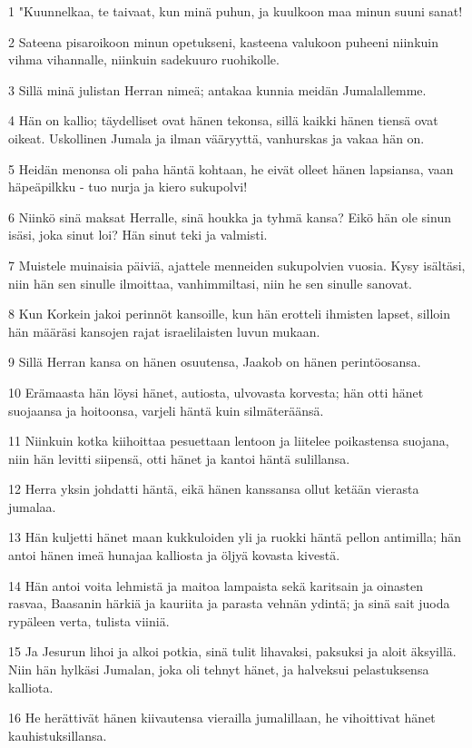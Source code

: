 \par 1 "Kuunnelkaa, te taivaat, kun minä puhun, ja kuulkoon maa minun suuni sanat!
\par 2 Sateena pisaroikoon minun opetukseni, kasteena valukoon puheeni niinkuin vihma vihannalle, niinkuin sadekuuro ruohikolle.
\par 3 Sillä minä julistan Herran nimeä; antakaa kunnia meidän Jumalallemme.
\par 4 Hän on kallio; täydelliset ovat hänen tekonsa, sillä kaikki hänen tiensä ovat oikeat. Uskollinen Jumala ja ilman vääryyttä, vanhurskas ja vakaa hän on.
\par 5 Heidän menonsa oli paha häntä kohtaan, he eivät olleet hänen lapsiansa, vaan häpeäpilkku - tuo nurja ja kiero sukupolvi!
\par 6 Niinkö sinä maksat Herralle, sinä houkka ja tyhmä kansa? Eikö hän ole sinun isäsi, joka sinut loi? Hän sinut teki ja valmisti.
\par 7 Muistele muinaisia päiviä, ajattele menneiden sukupolvien vuosia. Kysy isältäsi, niin hän sen sinulle ilmoittaa, vanhimmiltasi, niin he sen sinulle sanovat.
\par 8 Kun Korkein jakoi perinnöt kansoille, kun hän erotteli ihmisten lapset, silloin hän määräsi kansojen rajat israelilaisten luvun mukaan.
\par 9 Sillä Herran kansa on hänen osuutensa, Jaakob on hänen perintöosansa.
\par 10 Erämaasta hän löysi hänet, autiosta, ulvovasta korvesta; hän otti hänet suojaansa ja hoitoonsa, varjeli häntä kuin silmäteräänsä.
\par 11 Niinkuin kotka kiihoittaa pesuettaan lentoon ja liitelee poikastensa suojana, niin hän levitti siipensä, otti hänet ja kantoi häntä sulillansa.
\par 12 Herra yksin johdatti häntä, eikä hänen kanssansa ollut ketään vierasta jumalaa.
\par 13 Hän kuljetti hänet maan kukkuloiden yli ja ruokki häntä pellon antimilla; hän antoi hänen imeä hunajaa kalliosta ja öljyä kovasta kivestä.
\par 14 Hän antoi voita lehmistä ja maitoa lampaista sekä karitsain ja oinasten rasvaa, Baasanin härkiä ja kauriita ja parasta vehnän ydintä; ja sinä sait juoda rypäleen verta, tulista viiniä.
\par 15 Ja Jesurun lihoi ja alkoi potkia, sinä tulit lihavaksi, paksuksi ja aloit äksyillä. Niin hän hylkäsi Jumalan, joka oli tehnyt hänet, ja halveksui pelastuksensa kalliota.
\par 16 He herättivät hänen kiivautensa vierailla jumalillaan, he vihoittivat hänet kauhistuksillansa.
